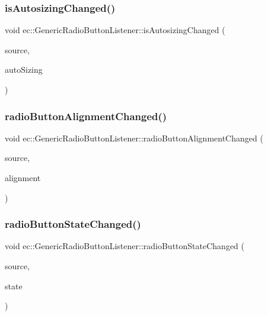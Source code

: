 \subsubsection{\texorpdfstring{is\+Autosizing\+Changed()}{isAutosizingChanged()}}
{\footnotesize\ttfamily void ec\+::\+Generic\+Radio\+Button\+Listener\+::is\+Autosizing\+Changed (\begin{DoxyParamCaption}\item[{agui\+::\+Radio\+Button $\ast$}]{source,  }\item[{bool}]{auto\+Sizing }\end{DoxyParamCaption})\hspace{0.3cm}{\ttfamily [override]}}

\mbox{\label{classec_1_1_generic_radio_button_listener_ac325d7d75fc038078368ab34addb1793}} 
\subsubsection{\texorpdfstring{radio\+Button\+Alignment\+Changed()}{radioButtonAlignmentChanged()}}
{\footnotesize\ttfamily void ec\+::\+Generic\+Radio\+Button\+Listener\+::radio\+Button\+Alignment\+Changed (\begin{DoxyParamCaption}\item[{agui\+::\+Radio\+Button $\ast$}]{source,  }\item[{agui\+::\+Area\+Alignment\+Enum}]{alignment }\end{DoxyParamCaption})\hspace{0.3cm}{\ttfamily [override]}}

\mbox{\label{classec_1_1_generic_radio_button_listener_a6bf0c1bac860be217d9ca235613263b7}} 
\subsubsection{\texorpdfstring{radio\+Button\+State\+Changed()}{radioButtonStateChanged()}}
{\footnotesize\ttfamily void ec\+::\+Generic\+Radio\+Button\+Listener\+::radio\+Button\+State\+Changed (\begin{DoxyParamCaption}\item[{agui\+::\+Radio\+Button $\ast$}]{source,  }\item[{agui\+::\+Radio\+Button\+::\+Radio\+Button\+State\+Enum}]{state }\end{DoxyParamCaption})\hspace{0.3cm}{\ttfamily [override]}}

